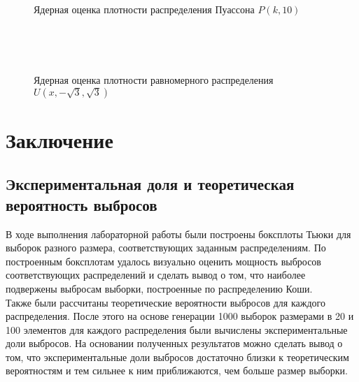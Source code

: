 \documentclass[12pt]{article}
\begin{document}
\newpage\begin{figure}[h!]
	\begin{center}
	\begin{minipage}[h]{0.65\linewidth}
	\end{minipage}
	\phantom{0}\\
	\begin{minipage}[h]{0.65\linewidth}
	\end{minipage}
	\phantom{0}\\
	\begin{minipage}[h]{0.65\linewidth}
	\end{minipage}
	\caption{Ядерная оценка плотности распределения Пуассона $P(k, 10)$}
\end{center}
\end{figure}
\newpage\begin{figure}[h!]
	\begin{center}
	\begin{minipage}[h]{0.65\linewidth}
	\end{minipage}
	\phantom{0}\\
	\begin{minipage}[h]{0.65\linewidth}
	\end{minipage}
	\phantom{0}\\
	\begin{minipage}[h]{0.65\linewidth}
	\end{minipage}
	\caption{Ядерная оценка плотности равномерного распределения $U(x, -\sqrt{3}, \sqrt{3})$}
\end{center}
\end{figure}
\newpage
\section{Заключение}
\subsection{Экспериментальная доля и теоретическая вероятность выбросов}
В ходе выполнения лабораторной работы были построены боксплоты Тьюки для выборок разного размера, соответствующих заданным распределениям. По построенным боксплотам удалось визуально оценить мощность выбросов соответствующих распределений и сделать вывод о том, что наиболее подвержены выбросам выборки, построенные по распределению Коши.\\
Также были рассчитаны теоретические вероятности выбросов для каждого распределения. После этого на основе генерации 1000 выборок размерами в 20 и 100 элементов для каждого распределения были вычислены экспериментальные доли выбросов. На основании полученных результатов можно сделать вывод о том, что экспериментальные доли выбросов достаточно близки к теоретическим вероятностям и тем сильнее к ним приближаются, чем больше размер выборки.
\end{document}
